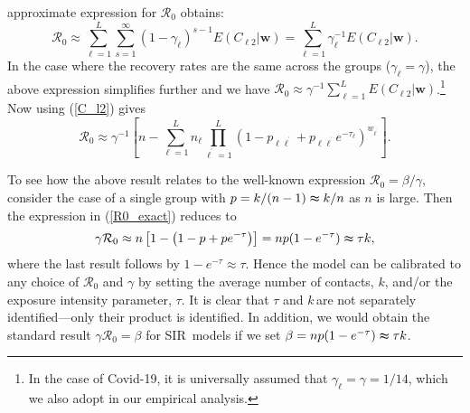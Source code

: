\documentclass[12pt]{article}
\begin{document}
approximate expression for $\mathcal{R}_{0}$ obtains:%
\[
\mathcal{R}_{0}\approx\sum_{\ell=1}^{L}\sum_{s=1}^{\infty}\left(
1-\gamma_{\ell}\right)  ^{s-1}E\left(  C_{\ell2}|\mathbf{w}\right)
=\sum_{\ell=1}^{L}\gamma_{\ell}^{-1}E\left(  C_{\ell2}|\mathbf{w}\right)  .
\]
In the case where the recovery rates are the same across the groups
($\gamma_{\ell}=\gamma$), the above expression simplifies further and we have
$\mathcal{R}_{0}\approx\gamma^{-1}\sum_{\ell=1}^{L}E\left(  C_{\ell
2}|\mathbf{w}\right)  $.\footnote{In the case of Covid-19, it is universally
assumed that $\gamma_{\ell}=\gamma=1/14$, which we also adopt in our empirical
analysis.} Now using (\ref{C_l2}) gives
\begin{equation}
\mathcal{R}_{0}\approx\gamma^{-1}\left[  n-\sum_{\ell=1}^{L}n_{\ell}%
\prod_{\ell^{^{\prime}}=1}^{L}\left(  1-p_{\ell\ell^{^{\prime}}}+p_{\ell
\ell^{^{\prime}}}e^{-\tau_{\ell}}\right)  ^{w_{\ell^{^{\prime}}}}\right]  .
\label{R0_exact}%
\end{equation}


To see how the above result relates to the well-known expression
$\mathcal{R}_{0}=\beta/\gamma$, consider the case of a single group with
$p=k/(n-1)\thickapprox k/n$ as $n$ is large. Then the expression in
(\ref{R0_exact}) reduces to%
\begin{equation}
\gamma\mathcal{R}_{0}\approx n\left[  1-\left(  1-p+pe^{-\tau}\right)
\right]  =np(1-e^{-\tau})\thickapprox\tau k,\label{R0_one group}%
\end{equation}
where the last result follows by $1-e^{-\tau}\approx\tau$. Hence the model can
be calibrated to any choice of $\mathcal{R}_{0}$ and $\gamma$ by setting the
average number of contacts, $k$, and/or the exposure intensity parameter,
$\tau$. It is clear that $\tau$ and $k\,$are not separately identified---only
their product is identified. In addition, we would obtain the standard result
$\gamma\mathcal{R}_{0}=\beta$ for SIR\ models if we set $\beta=np(1-e^{-\tau
})\thickapprox\tau k$.
\end{document}
